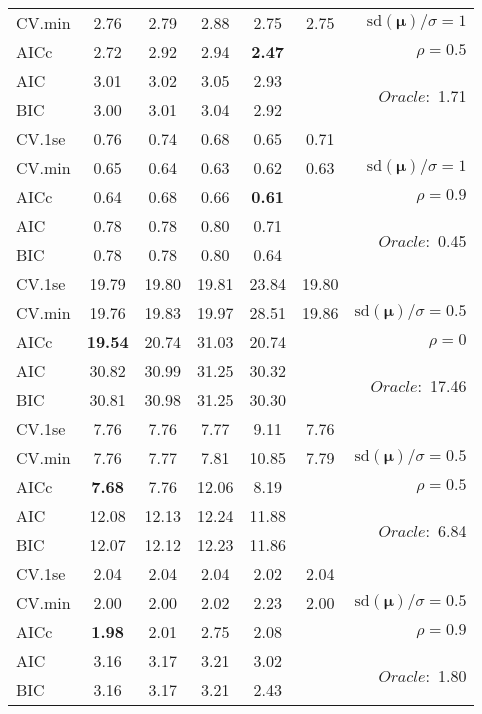 \begin{table}
\begin{center}
\begin{tabular}{l*{5}{c}|r}
CV.min & 2.76 & 2.79 & 2.88 & 2.75 & 2.75 &  $\mathrm{sd}(\mathbf{\mu})/\sigma=1$ \\
AICc & 2.72 & 2.92 & 2.94 & {\bf 2.47} & & $\rho=0.5$ \\
AIC & 3.01 & 3.02 & 3.05 & 2.93 & &  \multirow{2}{*}{$Oracle: $ 1.71} \\
BIC & 3.00 & 3.01 & 3.04 & 2.92 & &  \\
 \hline 
CV.1se & 0.76 & 0.74 & 0.68 & 0.65 & 0.71 & \\
CV.min & 0.65 & 0.64 & 0.63 & 0.62 & 0.63 &  $\mathrm{sd}(\mathbf{\mu})/\sigma=1$ \\
AICc & 0.64 & 0.68 & 0.66 & {\bf 0.61} & & $\rho=0.9$ \\
AIC & 0.78 & 0.78 & 0.80 & 0.71 & &  \multirow{2}{*}{$Oracle: $ 0.45} \\
BIC & 0.78 & 0.78 & 0.80 & 0.64 & &  \\
 \hline 
CV.1se & 19.79 & 19.80 & 19.81 & 23.84 & 19.80 & \\
CV.min & 19.76 & 19.83 & 19.97 & 28.51 & 19.86 &  $\mathrm{sd}(\mathbf{\mu})/\sigma=0.5$ \\
AICc & {\bf 19.54} & 20.74 & 31.03 & 20.74 & & $\rho=0$ \\
AIC & 30.82 & 30.99 & 31.25 & 30.32 & &  \multirow{2}{*}{$Oracle: $ 17.46} \\
BIC & 30.81 & 30.98 & 31.25 & 30.30 & &  \\
 \hline 
CV.1se & 7.76 & 7.76 & 7.77 & 9.11 & 7.76 & \\
CV.min & 7.76 & 7.77 & 7.81 & 10.85 & 7.79 &  $\mathrm{sd}(\mathbf{\mu})/\sigma=0.5$ \\
AICc & {\bf 7.68} & 7.76 & 12.06 & 8.19 & & $\rho=0.5$ \\
AIC & 12.08 & 12.13 & 12.24 & 11.88 & &  \multirow{2}{*}{$Oracle: $ 6.84} \\
BIC & 12.07 & 12.12 & 12.23 & 11.86 & &  \\
 \hline 
CV.1se & 2.04 & 2.04 & 2.04 & 2.02 & 2.04 & \\
CV.min & 2.00 & 2.00 & 2.02 & 2.23 & 2.00 &  $\mathrm{sd}(\mathbf{\mu})/\sigma=0.5$ \\
AICc & {\bf 1.98} & 2.01 & 2.75 & 2.08 & & $\rho=0.9$ \\
AIC & 3.16 & 3.17 & 3.21 & 3.02 & &  \multirow{2}{*}{$Oracle: $ 1.80} \\
BIC & 3.16 & 3.17 & 3.21 & 2.43 & &  \\
 \hline 
\end{tabular}
\end{center}
\vspace{-1cm}
\end{table}





